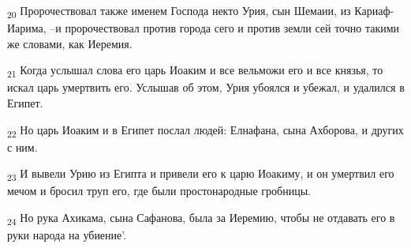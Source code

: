 \begin{tcolorbox}
\textsubscript{20} Пророчествовал также именем Господа некто Урия, сын Шемаии, из Кариаф-Иарима, --и пророчествовал против города сего и против земли сей точно такими же словами, как Иеремия.
\end{tcolorbox}
\begin{tcolorbox}
\textsubscript{21} Когда услышал слова его царь Иоаким и все вельможи его и все князья, то искал царь умертвить его. Услышав об этом, Урия убоялся и убежал, и удалился в Египет.
\end{tcolorbox}
\begin{tcolorbox}
\textsubscript{22} Но царь Иоаким и в Египет послал людей: Елнафана, сына Ахборова, и других с ним.
\end{tcolorbox}
\begin{tcolorbox}
\textsubscript{23} И вывели Урию из Египта и привели его к царю Иоакиму, и он умертвил его мечом и бросил труп его, где были простонародные гробницы.
\end{tcolorbox}
\begin{tcolorbox}
\textsubscript{24} Но рука Ахикама, сына Сафанова, была за Иеремию, чтобы не отдавать его в руки народа на убиение'.
\end{tcolorbox}
